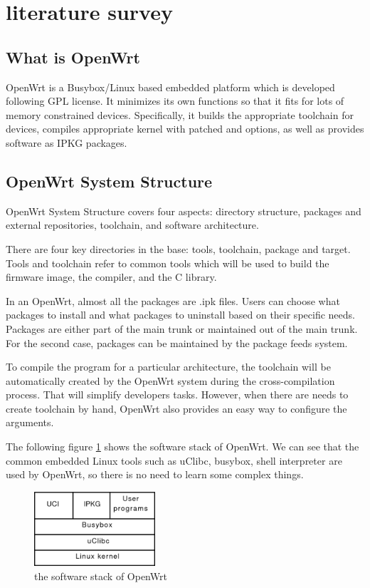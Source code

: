 \documentclass{sig-alternate-05-2015}
\begin{document}
	\section{literature survey}
	
	\subsection{What is OpenWrt}
	OpenWrt \cite{fainelli2008openwrt, kim2014implementation} is a Busybox/Linux based embedded platform which is developed following GPL license. It minimizes its own functions so that it fits for lots of memory constrained devices. Specifically, it builds the appropriate toolchain for devices, compiles appropriate kernel with patched and options, as well as provides software as IPKG packages.
	
	\subsection{OpenWrt System Structure}
	OpenWrt System Structure covers four aspects: directory structure, packages and external repositories, toolchain, and software architecture.
	
	There are four key directories in the base: tools, toolchain, package and target.
	Tools and toolchain refer to common tools which will be used to build the firmware image, the compiler, and the C library.
	
	In an OpenWrt, almost all the packages are .ipk files. Users can choose what packages to install and what packages to uninstall based on their specific needs. Packages are either part of the main trunk or maintained out of the main trunk. For the second case, packages can be maintained by the package feeds system.
	
	To compile the program for a particular architecture, the toolchain will be automatically created by the OpenWrt system during the cross-compilation process. That will simplify developers tasks. However, when there are needs to create toolchain by hand, OpenWrt also provides an easy way to configure the arguments.
	
	The following figure \ref{OpenWrt:stack} shows the software stack of OpenWrt. We can see that the common embedded Linux tools such as uClibc, busybox, shell interpreter are used by OpenWrt, so there is no need to learn some complex things.
	
	\begin{figure}
		\centering
		\includegraphics[width=0.4\textwidth]{stack.png}
		\caption{the software stack of OpenWrt}
		\label{OpenWrt:stack}
	\end{figure}
	
\end{document}
